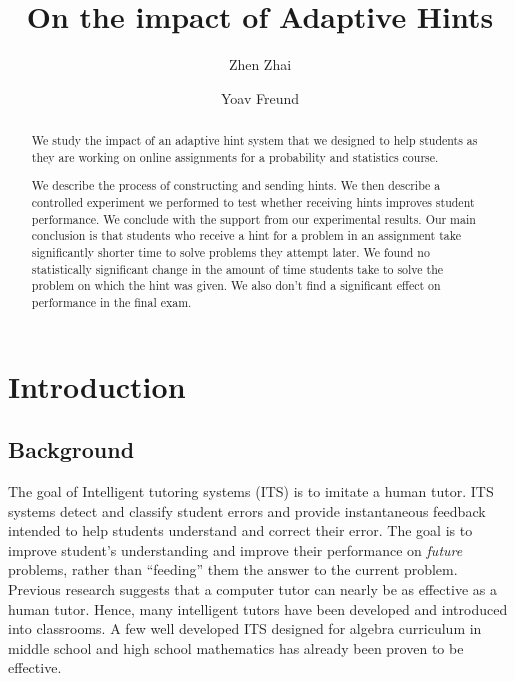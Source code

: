 \documentclass{llncs2e/llncs}
\title{On the impact of Adaptive Hints}
\author{Zhen Zhai\inst{1} \and Yoav Freund\inst{2}}
\institute{UC San Diego \email{zzhai@eng.ucsd.edu} \and UC San Diego \email{yfreund@eng.ucsd.edu}}
\begin{document}
\maketitle

\begin{abstract}

We study the impact of an adaptive hint system that we designed to help students as they are working on online assignments for a probability and statistics course.

We describe the process of constructing and sending hints. We then describe a controlled experiment we performed to test whether receiving hints improves student performance. We conclude with the support from our experimental results. Our main conclusion is that students who receive a hint for a problem in an assignment take significantly shorter time to solve problems they attempt later. We found no statistically significant change in the amount of time students take to solve the problem on which the hint was given. We also don't find a significant effect on performance in the final exam.

\end{abstract}



\section{Introduction}



\subsection*{Background}
The goal of Intelligent tutoring systems (ITS)\cite{Anderson1995} is to imitate a human tutor.  ITS systems detect and classify student errors and provide instantaneous feedback intended to help students
understand and correct their error. The goal is to improve
student's understanding and improve their performance on {\em future} problems, rather than ``feeding'' them the answer to the current problem.  Previous research suggests that a computer tutor can nearly be as effective as a human tutor\cite{Vanlehn2011}. Hence, many intelligent tutors have been developed and introduced into classrooms. A few well developed ITS designed for algebra curriculum in middle school and high school mathematics has already been proven
to be effective\cite{Koedinger1997,John2014}.
\end{document}
